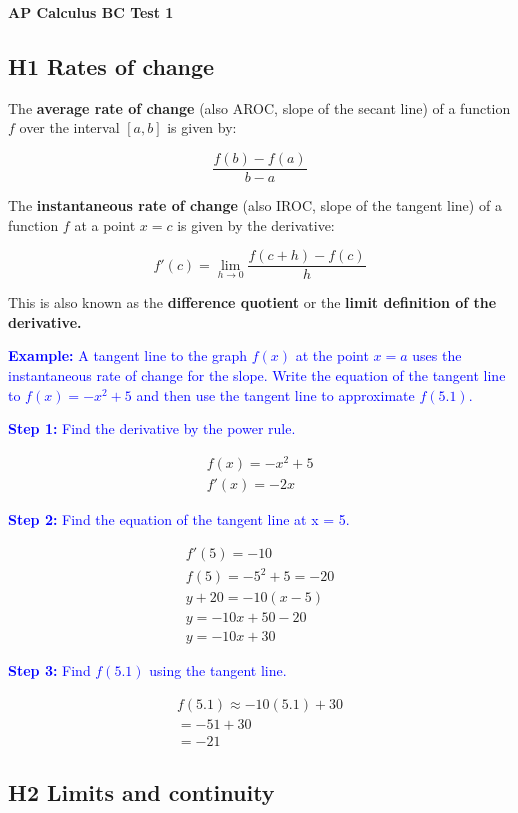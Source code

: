 \documentclass[letterpaper, 12pt]{article}
\newcommand{\example}[1]{\textcolor{blue}{\textbf{Example:} #1}}
\newcommand{\step}[2]{\textcolor{blue}{\textbf{Step #1:} #2}}
\begin{document}
\begin{center}
\textbf{{\Large AP Calculus BC Test 1}}
\end{center}

\subsection*{H1 Rates of change}

The \textbf{average rate of change} (also AROC, slope of the secant line) of a function $f$ over the interval $[a, b]$ is given by:

\[\frac{f(b) - f(a)}{b - a}\]

The \textbf{instantaneous rate of change} (also IROC, slope of the tangent line) of a function $f$ at a point $x = c$ is given by the derivative:

\[f'(c) = \lim_{h \to 0} \frac{f(c + h) - f(c)}{h}\]

This is also known as the \textbf{difference quotient} or the \textbf{limit definition of the derivative.}

\example{A tangent line to the graph $f(x)$ at the point $x = a$ uses the instantaneous rate of change for the slope. Write the equation of the tangent line to $f(x) = -x^2+5$ and then use the tangent line to approximate $f(5.1)$.}

\step{1}{Find the derivative by the power rule.}

\begin{gather*}
f(x) = -x^2+5 \\
f'(x) = -2x
\end{gather*}

\step{2}{Find the equation of the tangent line at x = 5.}

\begin{gather*}
f'(5) = -10 \\
f(5) = -5^2 + 5 = -20 \\
y+20 = -10(x-5) \\
y = -10x + 50 - 20 \\
y = -10x + 30
\end{gather*}

\step{3}{Find $f(5.1)$ using the tangent line.}

\begin{gather*}
f(5.1) \approx -10(5.1) + 30 \\ 
= -51 + 30 \\
= \boxed{-21}
\end{gather*}

\subsection*{H2 Limits and continuity}
\end{document}
